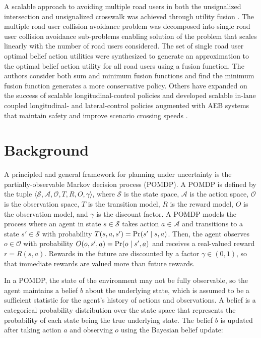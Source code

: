 \documentclass[conference]{IEEEtran}
\begin{document}
A scalable approach to avoiding multiple road users in both the unsignalized intersection and unsignalized crosswalk was achieved through utility fusion \cite{Bouton2018ScalableDriving}. The multiple road user collision avoidance problem was decomposed into single road user collision avoidance sub-problems enabling solution of the problem that scales linearly with the number of road users considered. The set of single road user optimal belief action utilities were synthesized to generate an approximation to the optimal belief action utility for all road users using a fusion function. The authors consider both sum and minimum fusion functions and find the minimum fusion function generates a more conservative policy. Others have expanded on the success of scalable longitudinal-control policies and developed scalable in-lane coupled longitudinal- and lateral-control policies augmented with AEB systems that maintain safety and improve scenario crossing speeds \cite{Schratter2019PedestrianOcclusions}.



\section{Background}
\label{sec:background}

A principled and general framework for planning under uncertainty is the partially-observable Markov decision process (POMDP). A POMDP is defined by the tuple $\langle \mathcal{S},\mathcal{A}, \mathcal{O}, T, R, O, \gamma \rangle$, where $\mathcal{S}$ is the state space, $\mathcal{A}$ is the action space, $\mathcal{O}$ is the observation space, $T$ is the transition model, $R$ is the reward model, $O$ is the observation model, and $\gamma$ is the discount factor. A POMDP models the process where an agent in state $s \in \mathcal{S}$ takes action $a \in \mathcal{A}$ and transitions to a state $s' \in \mathcal{S}$ with probability $T(s, a, s') = \textnormal{Pr}(s' \mid s, a)$. Then, the agent observes $o \in \mathcal{O}$ with probability $O(o, s',a) = \textnormal{Pr}(o\mid s', a)$ and receives a real-valued reward $r = R(s, a)$. Rewards in the future are discounted by a factor $\gamma \in (0,1)$, so that immediate rewards are valued more than future rewards.

In a POMDP, the state of the environment may not be fully observable, so the agent maintains a belief $b$ about the underlying state, which is assumed to be a sufficient statistic for the agent's history of actions and observations. A belief is a categorical probability distribution over the state space that represents the probability of each state being the true underlying state. The belief $b$ is updated after taking action $a$ and observing $o$ using the Bayesian belief update:
\end{document}
